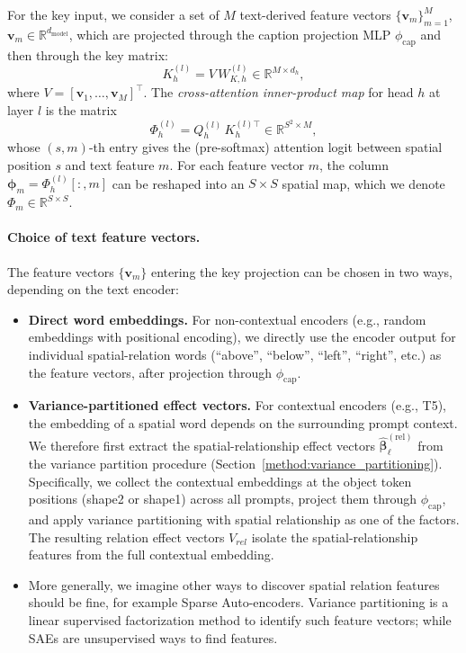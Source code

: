 \documentclass[10pt,twocolumn,letterpaper]{article}
\begin{document}
For the key input, we consider a set of $M$ text-derived feature vectors $\{\mathbf{v}_m\}_{m=1}^M$, $\mathbf{v}_m \in \mathbb{R}^{d_{\mathrm{model}}}$, which are projected through the caption projection MLP $\phi_{\mathrm{cap}}$ and then through the key matrix:
\begin{equation}
    K_h^{(l)} = V \, W_{K,h}^{(l)} \in \mathbb{R}^{M \times d_h},
\end{equation}
where $V = [\mathbf{v}_1, \dots, \mathbf{v}_M]^\top$. The \emph{cross-attention inner-product map} for head $h$ at layer $l$ is the matrix
\begin{equation}
    \Phi_h^{(l)} = Q_h^{(l)} \, K_h^{(l)\top} \in \mathbb{R}^{S^2 \times M},
    \label{eq:inner-product-map}
\end{equation}
whose $(s, m)$-th entry gives the (pre-softmax) attention logit between spatial position $s$ and text feature $m$. For each feature vector $m$, the column $\boldsymbol{\phi}_m = \Phi_h^{(l)}[:,m]$ can be reshaped into an $S \times S$ spatial map, which we denote $\Phi_m \in \mathbb{R}^{S \times S}$.

\paragraph{Choice of text feature vectors.}
The feature vectors $\{\mathbf{v}_m\}$ entering the key projection can be chosen in two ways, depending on the text encoder:

\begin{itemize}
    \item \textbf{Direct word embeddings.} For non-contextual encoders (e.g., random embeddings with positional encoding), we directly use the encoder output for individual spatial-relation words (``above'', ``below'', ``left'', ``right'', etc.) as the feature vectors, after projection through $\phi_{\mathrm{cap}}$.

    \item \textbf{Variance-partitioned effect vectors.} For contextual encoders (e.g., T5), the embedding of a spatial word depends on the surrounding prompt context. We therefore first extract the spatial-relationship effect vectors $\hat{\boldsymbol{\beta}}^{(\mathrm{rel})}_\ell$ from the variance partition procedure (Section~\ref{method:variance_partitioning}). Specifically, we collect the contextual embeddings at the object token positions (shape2 or shape1) across all prompts, project them through $\phi_{\mathrm{cap}}$, and apply variance partitioning with spatial relationship as one of the factors. The resulting relation effect vectors $V_{rel}$ isolate the spatial-relationship features from the full contextual embedding.
    \item More generally, we imagine other ways to discover spatial relation features should be fine, for example Sparse Auto-encoders. Variance partitioning is a linear supervised factorization method to identify such feature vectors; while SAEs are unsupervised ways to find features. 
\end{itemize}
\end{document}
